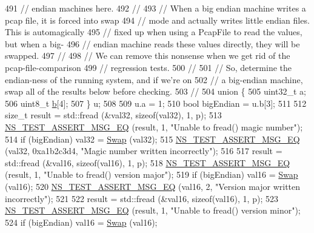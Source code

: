 \begin{DoxyCode}
491   \textcolor{comment}{// endian machines here.}
492   \textcolor{comment}{//}
493   \textcolor{comment}{// When a big endian machine writes a pcap file, it is forced into swap}
494   \textcolor{comment}{// mode and actually writes little endian files.  This is automagically}
495   \textcolor{comment}{// fixed up when using a PcapFile to read the values, but when a big-}
496   \textcolor{comment}{// endian machine reads these values directly, they will be swapped.}
497   \textcolor{comment}{//}
498   \textcolor{comment}{// We can remove this nonsense when we get rid of the pcap-file-comparison}
499   \textcolor{comment}{// regression tests.}
500   \textcolor{comment}{//}
501   \textcolor{comment}{// So, determine the endian-ness of the running system, and if we're on}
502   \textcolor{comment}{// a big-endian machine, swap all of the results below before checking.}
503   \textcolor{comment}{//}
504   \textcolor{keyword}{union }\{
505     uint32\_t a;
506     uint8\_t  \hyperlink{buildings__pathloss_8m_a21ad0bd836b90d08f4cf640b4c298e7c}{b}[4];
507   \} u;
508 
509   u.a = 1;
510   \textcolor{keywordtype}{bool} bigEndian = u.b[3];
511 
512   \textcolor{keywordtype}{size\_t} result = std::fread (&val32, \textcolor{keyword}{sizeof}(val32), 1, p);
513   \hyperlink{group__testing_ga2a9d78cffb3db8e867c35fff0b698cf5}{NS\_TEST\_ASSERT\_MSG\_EQ} (result, 1, \textcolor{stringliteral}{"Unable to fread() magic number"});
514   \textcolor{keywordflow}{if} (bigEndian) val32 = \hyperlink{pcap-file-test-suite_8cc_a9baeceaeb66adfc7bddae33a81ad8fa7}{Swap} (val32);
515   \hyperlink{group__testing_ga2a9d78cffb3db8e867c35fff0b698cf5}{NS\_TEST\_ASSERT\_MSG\_EQ} (val32, 0xa1b2c3d4, \textcolor{stringliteral}{"Magic number written incorrectly"});
516 
517   result = std::fread (&val16, \textcolor{keyword}{sizeof}(val16), 1, p);
518   \hyperlink{group__testing_ga2a9d78cffb3db8e867c35fff0b698cf5}{NS\_TEST\_ASSERT\_MSG\_EQ} (result, 1, \textcolor{stringliteral}{"Unable to fread() version major"});
519   \textcolor{keywordflow}{if} (bigEndian) val16 = \hyperlink{pcap-file-test-suite_8cc_a9baeceaeb66adfc7bddae33a81ad8fa7}{Swap} (val16);
520   \hyperlink{group__testing_ga2a9d78cffb3db8e867c35fff0b698cf5}{NS\_TEST\_ASSERT\_MSG\_EQ} (val16, 2, \textcolor{stringliteral}{"Version major written incorrectly"});
521 
522   result = std::fread (&val16, \textcolor{keyword}{sizeof}(val16), 1, p);
523   \hyperlink{group__testing_ga2a9d78cffb3db8e867c35fff0b698cf5}{NS\_TEST\_ASSERT\_MSG\_EQ} (result, 1, \textcolor{stringliteral}{"Unable to fread() version minor"});
524   \textcolor{keywordflow}{if} (bigEndian) val16 = \hyperlink{pcap-file-test-suite_8cc_a9baeceaeb66adfc7bddae33a81ad8fa7}{Swap} (val16);

\end{DoxyCode}
